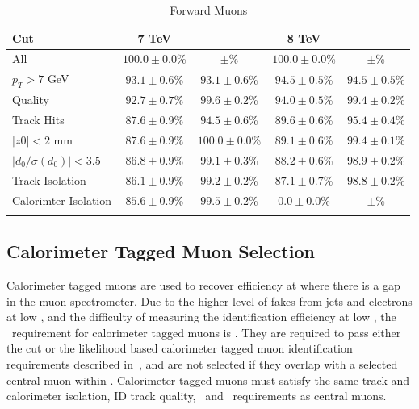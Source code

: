 \begin{table}[htbp]
\centering
\begin{tabular}{l|c|c|c|c}
\hline\hline
Cut & 7 TeV &  & 8 TeV &  \\
\hline
                          All &  $100.0 \pm 0.0$\% &          $ \pm $\% &  $100.0 \pm 0.0$\% &         $ \pm $\% \\
                $p_{T}>7$ GeV &   $93.1 \pm 0.6$\% &   $93.1 \pm 0.6$\% &   $94.5 \pm 0.5$\% &  $94.5 \pm 0.5$\% \\
                      Quality &   $92.7 \pm 0.7$\% &   $99.6 \pm 0.2$\% &   $94.0 \pm 0.5$\% &  $99.4 \pm 0.2$\% \\
                   Track Hits &   $87.6 \pm 0.9$\% &   $94.5 \pm 0.6$\% &   $89.6 \pm 0.6$\% &  $95.4 \pm 0.4$\% \\
                $|z0| < 2$ mm &   $87.6 \pm 0.9$\% &  $100.0 \pm 0.0$\% &   $89.1 \pm 0.6$\% &  $99.4 \pm 0.1$\% \\
$|d_{0}/\sigma(d_{0})| < 3.5$ &   $86.8 \pm 0.9$\% &   $99.1 \pm 0.3$\% &   $88.2 \pm 0.6$\% &  $98.9 \pm 0.2$\% \\
              Track Isolation &   $86.1 \pm 0.9$\% &   $99.2 \pm 0.2$\% &   $87.1 \pm 0.7$\% &  $98.8 \pm 0.2$\% \\
         Calorimter Isolation &   $85.6 \pm 0.9$\% &   $99.5 \pm 0.2$\% &    $0.0 \pm 0.0$\% &         $ \pm $\% \\
\hline\hline
\caption{Forward Muons}
\end{tabular}
\end{table}

\subsection{Calorimeter Tagged Muon Selection}

Calorimeter tagged muons are used to recover efficiency at  where
there is a gap in the muon-spectrometer. Due to the higher level of fakes from jets and
electrons at low \pt, and the difficulty of measuring the identification
efficiency at low \pt, the \pt\ requirement for calorimeter tagged muons is
. They are required to pass either the cut or
the likelihood based calorimeter tagged muon identification requirements described
in~, and are not selected if they overlap with a selected
central muon within . Calorimeter tagged muons must satisfy the
same track and calorimeter isolation, ID track quality, \zzero\ and \dzerosig\
requirements as central muons.

